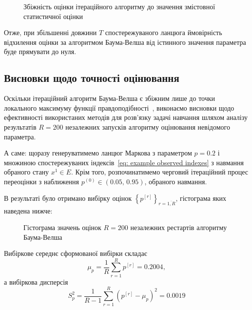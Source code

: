 \begin{figure}[H]\centering
    \setfontsize{14pt}
    
    \caption{Збіжність оцінки ітераційного алгоритму до значення змістовної статистичної оцінки}
    \label{pic: p statistical estimation}
\end{figure}

Отже, при збільшенні довжини $T$ спостережуваного ланцюга ймовірність відхилення оцінки за алгоритмом Баума-Велша від істинного значення параметра буде прямувати до нуля.

\subsection{Висновки щодо точності оцінювання}
\label{chap: restarts}

Оскільки ітераційний алгоритм Баума-Велша є збіжним лише до точки локального максимуму функції правдоподібності~\cite[розділ 15]{Koski2001}, виконаємо висновки щодо ефективності використаних методів для розв'язку задачі навчання шляхом аналізу результатів $R=200$ незалежних запусків алгоритму оцінювання невідомого параметра.

А саме: щоразу генеруватимемо ланцюг Маркова з параметром $p=0.2$ і множиною спостережуваних індексів~\eqref{eq: example observed indexes} з навмання обраного стану $x^1 \in E$. Крім того, розпочинатимемо черговий ітераційний процес переоцінки з наближення $p^{(0)} \in (0.05,\,0.95)$, обраного навмання.

В результаті було отримано вибірку оцінок $\left\{ p^{[r]} \right\}_{r=\overline{1,R}}$, гістограма яких наведена нижче:

\begin{figure}[H]\centering
    \setfontsize{14pt}
    
    \caption{Гістограма значень оцінок $R=200$ незалежних рестартів алгоритму Баума-Велша}
    \label{pic: p restarts baum-welch estimations}
\end{figure}

Вибіркове середнє сформованої вибірки складає
\begin{equation*}
    \mu_p = \frac{1}{R} \sum\limits_{r=1}^R p^{[r]} = 0.2004,
\end{equation*}
а вибіркова дисперсія
\begin{equation}\label{eq: p sample covariance}
    S^2_p = \frac{1}{R-1} \sum\limits_{r=1}^R \left( p^{[r]} - \mu_p \right)^2 = 0.0019
\end{equation}

